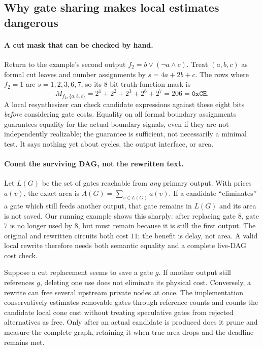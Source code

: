 \subsection{Why gate sharing makes local estimates dangerous}
\paragraph{A cut mask that can be checked by hand.} Return to the example's second output $f_2=b\lor(\neg a\land c)$. Treat $(a,b,c)$ as formal cut leaves and number assignments by $s=4a+2b+c$. The rows where $f_2=1$ are $s=1,2,3,6,7$, so its 8-bit truth-function mask is
\[
 M_{f_2,\{a,b,c\}}=2^1+2^2+2^3+2^6+2^7=206=\texttt{0xCE}.
\]
A local resynthesizer can check candidate expressions against these eight bits \emph{before} considering gate costs. Equality on all formal boundary assignments guarantees equality for the actual boundary signals, even if they are not independently realizable; the guarantee is sufficient, not necessarily a minimal test. It says nothing yet about cycles, the output interface, or area.

\paragraph{Count the surviving DAG, not the rewritten text.} Let $L(G)$ be the set of gates reachable from \emph{any} primary output. With prices $a(v)$, the exact area is $A(G)=\sum_{v\in L(G)}a(v)$. If a candidate ``eliminates'' a gate which still feeds another output, that gate remains in $L(G)$ and its area is not saved. Our running example shows this sharply: after replacing gate $8$, gate $7$ is no longer used by $8$, but must remain because it is still the first output. The original and rewritten circuits both cost $11$; the benefit is delay, not area. A valid local rewrite therefore needs both semantic equality and a complete live-DAG cost check.

Suppose a cut replacement seems to save a gate $g$. If another output still references $g$, deleting one use does not eliminate its physical cost. Conversely, a rewrite can free several upstream private nodes at once. The implementation conservatively estimates removable gates through reference counts and counts the candidate local cone cost without treating speculative gates from rejected alternatives as free. Only after an actual candidate is produced does it prune and measure the complete graph, retaining it when true area drops and the deadline remains met.

